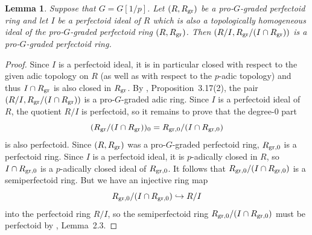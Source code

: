 \documentclass[12pt,twoside,a4paper]{article}
\newtheorem{lemma}[thm]{Lemma}
\theoremstyle{definition}
\theoremstyle{remark}
\newcommand\gr{{\rm gr}}
\begin{document}
\begin{lemma}\label{Quotients by perfectoid ideals}Suppose that $G=G[1/p]$. Let $(R, R_{\gr})$ be a pro-$G$-graded perfectoid ring and let $I$ be a perfectoid ideal of $R$ which is also a topologically homogeneous ideal of the pro-$G$-graded perfectoid ring $(R, R_{\gr})$. Then $(R/I, R_{\gr}/(I\cap R_{\gr}))$ is a pro-$G$-graded perfectoid ring.\end{lemma}
\begin{proof}Since $I$ is a perfectoid ideal, it is in particular closed with respect to the given adic topology on $R$ (as well as with respect to the $p$-adic topology) and thus $I\cap R_{\gr}$ is also closed in $R_{\gr}$. By \cite{Ishizuka-Yoshikawa25}, Proposition~3.17(2), the pair $(R/I, R_{\gr}/(I\cap R_{\gr}))$ is a pro-$G$-graded adic ring. Since $I$ is a perfectoid ideal of $R$, the quotient $R/I$ is perfectoid, so it remains to prove that the degree-$0$ part \begin{equation*}(R_{\gr}/(I\cap R_{\gr}))_{0}=R_{\gr,0}/(I\cap R_{\gr,0})\end{equation*}is also perfectoid. Since $(R, R_{\gr})$ was a pro-$G$-graded perfectoid ring, $R_{\gr,0}$ is a perfectoid ring. Since $I$ is a perfectoid ideal, it is $p$-adically closed in $R$, so $I\cap R_{\gr,0}$ is a $p$-adically closed ideal of $R_{\gr,0}$. It follows that $R_{\gr,0}/(I\cap R_{\gr,0})$ is a semiperfectoid ring. But we have an injective ring map \begin{equation*}R_{\gr,0}/(I\cap R_{\gr,0})\hookrightarrow R/I\end{equation*}into the perfectoid ring $R/I$, so the semiperfectoid ring $R_{\gr,0}/(I\cap R_{\gr,0})$ must be perfectoid by \cite{Dine-Ishizuka23}, Lemma~2.3. \end{proof}
\end{document}
